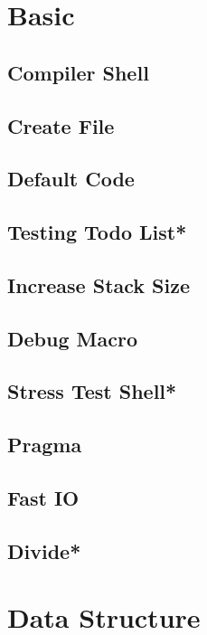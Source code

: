 \section{Basic}
\subsection{Compiler Shell}

\subsection{Create File}

\subsection{Default Code}

\subsection{Testing Todo List*}

\subsection{Increase Stack Size}

\subsection{Debug Macro}

\subsection{Stress Test Shell*}

\subsection{Pragma}

\subsection{Fast IO}

\subsection{Divide*}


\section{Data Structure}
